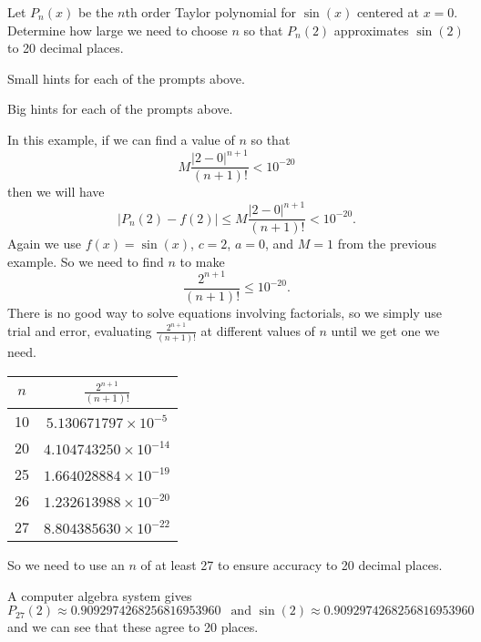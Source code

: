 \begin{activity} \label{8.5.Act5} Let $P_n(x)$ be the $n$th order Taylor polynomial for $\sin(x)$ centered at $x=0$. Determine how large we need to choose $n$ so that $P_n(2)$ approximates $\sin(2)$ to 20 decimal places.

\end{activity}

\begin{smallhint}
\ba
	\item Small hints for each of the prompts above.
\ea
\end{smallhint}
\begin{bighint}
\ba
	\item Big hints for each of the prompts above.
\ea
\end{bighint}
\begin{activitySolution}
In this example, if we can find a value of $n$ so that
\[ M\frac{|2-0|^{n+1}}{(n+1)!} < 10^{-20}\]
then we will have
\[|P_n(2) - f(2)| \leq M\frac{|2-0|^{n+1}}{(n+1)!} < 10^{-20}.\]
Again we use $f(x) = \sin(x)$,  $c = 2$, $a=0$, and $M = 1$ from the previous example. So we need to find $n$ to make
\[\frac{2^{n+1}}{(n+1)!} \leq 10^{-20}.\]
There is no good way to solve equations involving factorials, so we simply use trial and error, evaluating $\frac{2^{n+1}}{(n+1)!}$ at different values of $n$ until we get one we need.
\begin{center}
\begin{tabular}{|c|c|} \hline
$n$     &$\frac{2^{n+1}}{(n+1)!}$ \\ \hline
10      &$5.130671797 \times 10^{-5}$ \\ \hline
20      &$4.104743250 \times 10^{-14}$ \\ \hline
25      &$1.664028884 \times 10^{-19}$ \\ \hline
26      &$1.232613988 \times 10^{-20}$ \\ \hline
27      &$8.804385630 \times 10^{-22}$ \\ \hline
\end{tabular}
\end{center}
So we need to use an $n$ of at least 27 to ensure accuracy to 20 decimal places.

A computer algebra system gives
\[P_{27}(2) \approx 0.9092974268256816953960 \ \ \text{ and } \sin(2) \approx 0.9092974268256816953960\]
and we can see that these agree to 20 places.

\end{activitySolution}
\aftera 